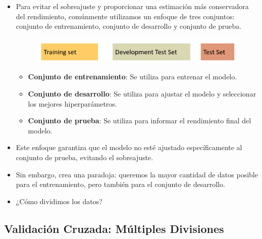 \begin{itemize}
 \item Para evitar el sobreajuste y proporcionar una estimación más conservadora del rendimiento, comúnmente utilizamos un enfoque de tres conjuntos: conjunto de entrenamiento, conjunto de desarrollo y conjunto de prueba.
\begin{figure}[h]
\includegraphics[scale = 0.23]{pics/devsets.png}
\end{figure}

\begin{itemize}
\item \textbf{Conjunto de entrenamiento}: Se utiliza para entrenar el modelo.
\item \textbf{Conjunto de desarrollo}: Se utiliza para ajustar el modelo y seleccionar los mejores hiperparámetros.
\item \textbf{Conjunto de prueba}: Se utiliza para informar el rendimiento final del modelo.
\end{itemize}

\item Este enfoque garantiza que el modelo no esté ajustado específicamente al conjunto de prueba, evitando el sobreajuste.
\item Sin embargo, crea una paradoja: queremos la mayor cantidad de datos posible para el entrenamiento, pero también para el conjunto de desarrollo.
\item ¿Cómo dividimos los datos?

\end{itemize}





\subsection{Validación Cruzada: Múltiples Divisiones}


